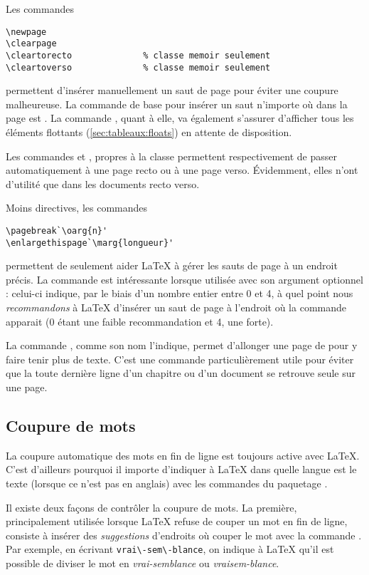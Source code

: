 Les commandes
\begin{lstlisting}
\newpage
\clearpage
\cleartorecto              % classe memoir seulement
\cleartoverso              % classe memoir seulement
\end{lstlisting}
permettent d'insérer manuellement un saut de page pour éviter une
coupure malheureuse. La commande de base pour insérer un saut
n'importe où dans la page est \cmd{\newpage}. La commande
\cmd{\clearpage}, quant à elle, va également s'assurer d'afficher tous
les éléments flottants (\autoref{sec:tableaux:floats}) en attente de
disposition.

Les commandes \cmd{\cleartorecto} et \cmd{\cleartoverso}, propres à la
classe  permettent respectivement de passer
automatiquement à une page recto ou à une page verso. Évidemment, elles
n'ont d'utilité que dans les documents recto verso.

Moins directives, les commandes
\begin{lstlisting}
\pagebreak`\oarg{n}'
\enlargethispage`\marg{longueur}'
\end{lstlisting}
permettent de seulement aider {\LaTeX} à gérer les sauts de page à un
endroit précis. La commande \cmd{\pagebreak} est intéressante
lorsque utilisée avec son argument optionnel : celui-ci
indique, par le biais d'un nombre entier entre 0 et 4, à quel point
nous \emph{recommandons} à {\LaTeX} d'insérer un saut de page à
l'endroit où la commande apparait (0 étant une faible recommandation
et 4, une forte).

La commande \cmd{\enlargethispage}, comme son nom l'indique, permet
d'allonger une page de  pour y faire tenir plus de
texte. C'est une commande particulièrement utile pour éviter que la
toute dernière ligne d'un chapitre ou d'un document se retrouve seule sur
une page.

\subsection{Coupure de mots}
\label{sec:trucs:controle:coupure}

La coupure automatique des mots en fin de ligne est toujours active
avec {\LaTeX}. C'est d'ailleurs pourquoi il importe d'indiquer à
{\LaTeX} dans quelle langue est le texte (lorsque ce n'est pas en
anglais) avec les commandes du paquetage .

Il existe deux façons de contrôler la coupure de mots. La première,
principalement utilisée lorsque {\LaTeX} refuse de couper un mot en
fin de ligne, consiste à insérer des \emph{suggestions} d'endroits où
couper le mot avec la commande \cmd{\-}. Par exemple, en écrivant
\verb=vrai\-sem\-blance=, on indique à {\LaTeX} qu'il est possible de
diviser le mot en \emph{vrai-semblance} ou \emph{vraisem-blance}.

